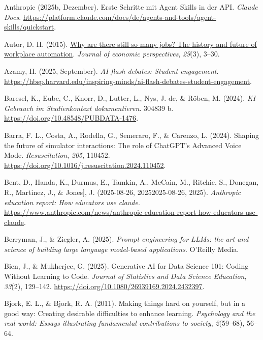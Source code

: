 \documentclass[
  ngerman,
  letterpaper,
  DIV=11]{scrreprt}
\newlength{\cslhangindent}
\newenvironment{CSLReferences}[2] %
 {\begin{list}{}{%
  \setlength{\itemindent}{0pt}
  \setlength{\leftmargin}{0pt}
  \setlength{\parsep}{0pt}
  \ifodd #1
   \setlength{\leftmargin}{\cslhangindent}
   \setlength{\itemindent}{-1\cslhangindent}
  \fi
  \setlength{\itemsep}{#2\baselineskip}}}
 {\end{list}}
\begin{document}
\begin{CSLReferences}{1}{0}
Anthropic (2025b, Dezember). Erste Schritte mit Agent Skills in der API.
\emph{Claude Docs}.
\url{https://platform.claude.com/docs/de/agents-and-tools/agent-skills/quickstart}.

Autor, D. H. (2015).
\href{https://www.aeaweb.org/articles?id=10.1257\%2Fjep.29.3.3&source=post_page}{Why
are there still so many jobs? The history and future of workplace
automation}. \emph{Journal of economic perspectives}, \emph{29}(3),
3--30.

Azamy, H. (2025, September). \emph{AI flash debates: Student
engagement}.
\url{https://hbsp.harvard.edu/inspiring-minds/ai-flash-debates-student-engagement}.

Baresel, K., Eube, C., Knorr, D., Lutter, L., Nys, J. de, \& Röben, M.
(2024). \emph{KI-Gebrauch im Studienkontext dokumentieren}. 304839 b.
\url{https://doi.org/10.48548/PUBDATA-1476}.

Barra, F. L., Costa, A., Rodella, G., Semeraro, F., \& Carenzo, L.
(2024). Shaping the future of simulator interactions: The role of
ChatGPT's Advanced Voice Mode. \emph{Resuscitation}, \emph{205}, 110452.
\url{https://doi.org/10.1016/j.resuscitation.2024.110452}.

Bent, D., Handa, K., Durmus, E., Tamkin, A., McCain, M., Ritchie, S.,
Donegan, R., Martinez, J., \& Jones{]}, J. (2025-08-26, 20252025-08-26,
2025). \emph{Anthropic education report: How educators use claude}.
\url{https://www.anthropic.com/news/anthropic-education-report-how-educators-use-claude}.

Berryman, J., \& Ziegler, A. (2025). \emph{Prompt engineering for LLMs:
the art and science of building large language model-based
applications}. O'Reilly Media.

Bien, J., \& Mukherjee, G. (2025). Generative AI for Data Science 101:
Coding Without Learning to Code. \emph{Journal of Statistics and Data
Science Education}, \emph{33}(2), 129--142.
\url{https://doi.org/10.1080/26939169.2024.2432397}.

Bjork, E. L., \& Bjork, R. A. (2011). Making things hard on yourself,
but in a good way: Creating desirable difficulties to enhance learning.
\emph{Psychology and the real world: Essays illustrating fundamental
contributions to society}, \emph{2}(59--68), 56--64.


\end{CSLReferences}
\end{document}
